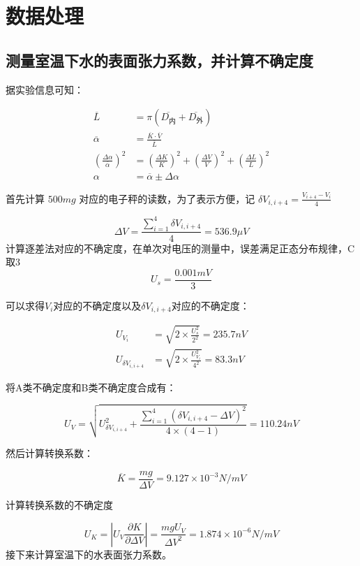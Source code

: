 \documentclass{ctexart}
\begin{document}
\newpage

\section{数据处理}
\subsection{测量室温下水的表面张力系数，并计算不确定度}
据实验信息可知：

\begin{align*}
    \overline{L} &= \pi \left(\overline{D_{\text{内}}} + \overline{D_{\text{外}}}\right) \\
    \overline{\alpha} &= \frac{\overline{K} \cdot \overline{V}}{\overline{L}} \\
    \left(\frac{\Delta \alpha}{\overline{\alpha}}\right)^2 &= \left(\frac{\Delta K}{K}\right)^2 + \left(\frac{\Delta V}{V}\right)^2 + \left(\frac{\Delta L}{L}\right)^2 \\
    \alpha &= \overline{\alpha} \pm \Delta \alpha 
\end{align*}

首先计算 $500mg$ 对应的电子秤的读数，为了表示方便，记 $ \delta V_{i,i+4} = \frac{V_{i+4}-V_{i}}{4} $

$$ \Delta V = \frac{\sum\limits_{i = 1}^{4} \delta V_{i,i+4} }{4} = 536.9 \mu V $$
计算逐差法对应的不确定度，在单次对电压的测量中，误差满足正态分布规律，C取3
$$ U_s = \frac{0.001mV}{3} $$


可以求得$V_i$对应的不确定度以及$\delta V_{i,i+4}$对应的不确定度：

\begin{align*}
    U_{V_i} &= \sqrt{2 \times \frac{U_s^2}{2^2}} = 235.7 nV \\
    U_{\delta V_{i,i+4}} &= \sqrt{2 \times \frac{U_{V_i}^2}{4^2}} = 83.3 nV
\end{align*}

将A类不确定度和B类不确定度合成有：

$$ U_{V} = \sqrt{U_{\delta V_{i,i+4}}^2 + \frac{\sum\limits_{i=1}^{4} \left(\delta V_{i,i+4} - \Delta V\right)^2}{4 \times (4-1)}} = 110.24 nV $$

然后计算转换系数：

$$ \overline{K} = \frac{mg}{\Delta V} = 9.127 \times 10^{-3} N/mV $$

计算转换系数的不确定度 

$$ U_K = \left|U_V\frac{\partial K}{\partial \Delta V}\right| = \frac{mg U_V}{\Delta V^2} = 1.874 \times 10^{-6} N/mV $$
接下来计算室温下的水表面张力系数。 
\end{document}
